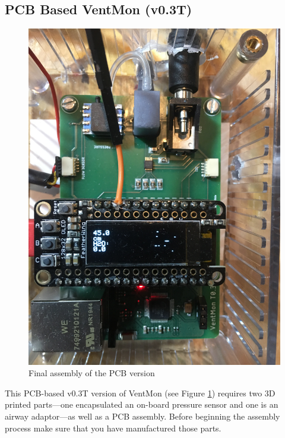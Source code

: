 \documentclass[11pt, letterpaper]{article}
\begin{document}

\subsection{PCB Based VentMon (v0.3T)}


\begin{figure}[H]
\centering
\includegraphics[width=\textwidth]{images/PCBVentMon.JPG}
\caption{Final assembly of the PCB version}
\label{fig:finalPCB}
\end{figure}

This PCB-based v0.3T version of VentMon (see Figure \ref{fig:finalPCB}) requires two 3D printed parts---one encapsulated an on-board pressure sensor and one is an airway adaptor---as well as a PCB assembly. Before beginning the assembly process make sure that you have manufactured those parts.
\end{document}
